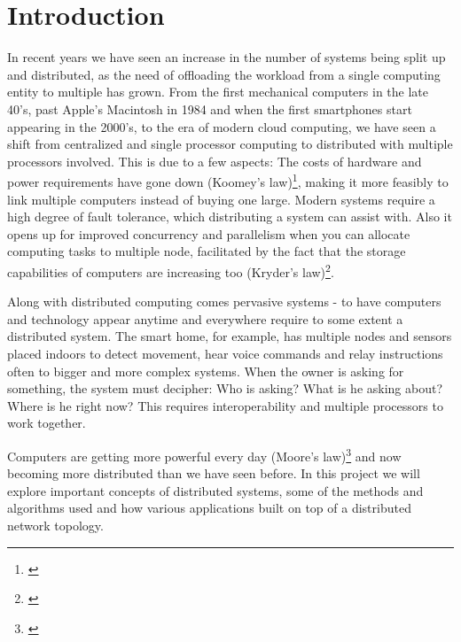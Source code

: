 \chapter{Introduction} \label{ch:introduction}

In recent years we have seen an increase in the number of systems being split up and distributed, as the need of offloading the workload from a single computing entity to multiple has grown. From the first mechanical computers in the late 40's, past Apple's Macintosh in 1984 and when the first smartphones start appearing in the 2000's, to the era of modern cloud computing, we have seen a shift from centralized and single processor computing to distributed with multiple processors involved. This is due to a few aspects: The costs of hardware and power requirements have gone down (Koomey's law)\footnote{\cite{Koomey2011}}, making it more feasibly to link multiple computers instead of buying one large. Modern systems require a high degree of fault tolerance, which distributing a system can assist with. Also it opens up for improved concurrency and parallelism when you can allocate computing tasks to multiple node, facilitated by the fact that the storage capabilities of computers are increasing too (Kryder's law)\footnote{\cite{Walter2005}}.

Along with distributed computing comes pervasive systems - to have computers and technology appear anytime and everywhere require to some extent a distributed system. The smart home, for example, has multiple nodes and sensors placed indoors to detect movement, hear voice commands and relay instructions often to bigger and more complex systems. When the owner is asking for something, the system must decipher: Who is asking? What is he asking about? Where is he right now? This requires interoperability and multiple processors to work together.

Computers are getting more powerful every day (Moore's law)\footnote{\cite{Moore1965}} and now becoming more distributed than we have seen before. In this project we will explore important concepts of distributed systems, some of the methods and algorithms used and how various applications built on top of a distributed network topology.